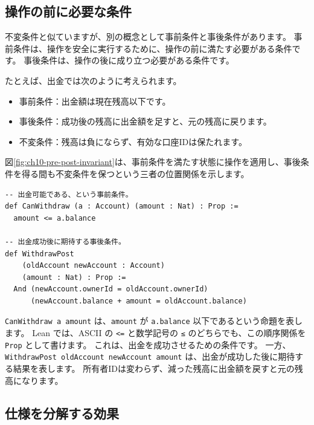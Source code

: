 \subsection{操作の前に必要な条件}

不変条件と似ていますが、別の概念として事前条件と事後条件があります。
事前条件は、操作を安全に実行するために、操作の前に満たす必要がある条件です。
事後条件は、操作の後に成り立つ必要がある条件です。

たとえば、出金では次のように考えられます。

\begin{itemize}
\item 事前条件：出金額は現在残高以下です。
\item 事後条件：成功後の残高に出金額を足すと、元の残高に戻ります。
\item 不変条件：残高は負にならず、有効な口座IDは保たれます。
\end{itemize}

図\ref{fig:ch10-pre-post-invariant}は、事前条件を満たす状態に操作を適用し、事後条件を得る間も不変条件を保つという三者の位置関係を示します。


\begin{listing}[htbp]
\begin{verbatim}
-- 出金可能である、という事前条件。
def CanWithdraw (a : Account) (amount : Nat) : Prop :=
  amount <= a.balance

-- 出金成功後に期待する事後条件。
def WithdrawPost
    (oldAccount newAccount : Account)
    (amount : Nat) : Prop :=
  And (newAccount.ownerId = oldAccount.ownerId)
      (newAccount.balance + amount = oldAccount.balance)
\end{verbatim}
\caption{\texttt{CanWithdraw} と \texttt{WithdrawPost}}
\label{lst:ch10_pre_post}
\end{listing}

\texttt{CanWithdraw a amount} は、\texttt{amount} が \texttt{a.balance} 以下であるという命題を表します。
Lean では、ASCII の \texttt{<=} と数学記号の \texttt{≤} のどちらでも、この順序関係を \texttt{Prop} として書けます。
これは、出金を成功させるための条件です。
一方、\texttt{WithdrawPost oldAccount newAccount amount} は、出金が成功した後に期待する結果を表します。
所有者IDは変わらず、減った残高に出金額を戻すと元の残高になります。

\subsection{仕様を分解する効果}

